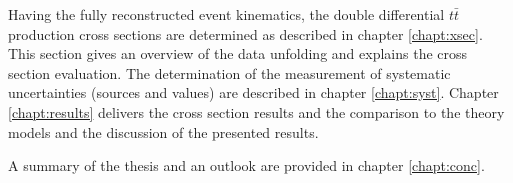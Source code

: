 Having the fully reconstructed event kinematics, the double differential $t\bar{t}$ production cross sections are determined
as described in chapter \ref{chapt:xsec}. This section gives an overview of the data unfolding and explains the cross section evaluation. 
The determination of the measurement of systematic uncertainties (sources and values) are described in chapter \ref{chapt:syst}. 
Chapter \ref{chapt:results} delivers the cross section results and the comparison to the theory models and the discussion of 
the presented results.

A summary of the thesis and an outlook are provided in chapter \ref{chapt:conc}.